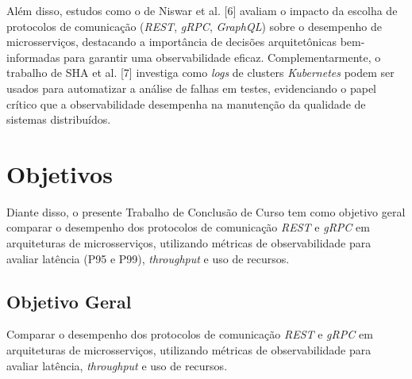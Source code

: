 Além disso, estudos como o de Niswar et al. [6] avaliam o impacto da escolha de protocolos de comunicação (\textit{REST}, \textit{gRPC}, \textit{GraphQL}) sobre o desempenho de microsserviços, destacando a importância de decisões arquitetônicas bem-informadas para garantir uma observabilidade eficaz. Complementarmente, o trabalho de SHA et al. [7] investiga como \textit{logs} de clusters \textit{Kubernetes} podem ser usados para automatizar a análise de falhas em testes, evidenciando o papel crítico que a observabilidade desempenha na manutenção da qualidade de sistemas distribuídos.

\section{Objetivos}\label{sec:objetivos}

Diante disso, o presente Trabalho de Conclusão de Curso tem como objetivo geral comparar o desempenho dos protocolos de comunicação \textit{REST} e \textit{gRPC} em arquiteturas de microsserviços, utilizando métricas de observabilidade para avaliar latência (P95 e P99), \textit{throughput} e uso de recursos.

\subsection{Objetivo Geral}\label{subsec:objetivosgerais}

Comparar o desempenho dos protocolos de comunicação \textit{REST} e \textit{gRPC} em arquiteturas de microsserviços, utilizando métricas de observabilidade para avaliar latência, \textit{throughput} e uso de recursos.

